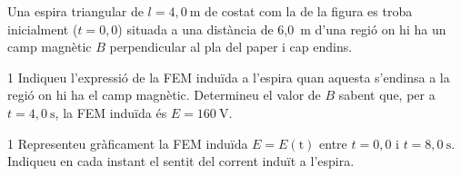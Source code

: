 Una espira triangular de $l = 4,0\ \mathrm{m}$ de costat com la de la figura es troba inicialment ($t = 0,0$) situada a una distància de 6,0~m d'una regió on hi ha un camp magnètic $B$ perpendicular al pla del paper i cap endins.


\begin{apartat}{1}
Indiqueu l'expressió de la FEM induïda a l'espira quan aquesta s'endinsa a la regió on hi ha el camp magnètic. Determineu el valor de $B$ sabent que, per a $t = 4,0\ \mathrm{s}$, la FEM induïda és $E = 160\ \mathrm{V}$.
\end{apartat}

\begin{apartat}{1}
Representeu gràficament la FEM induïda $E = E(\mathrm{t})$ entre $t = 0,0$ i $t = 8,0\ \mathrm{s}$. Indiqueu en cada instant el sentit del corrent induït a l'espira.
\end{apartat}
